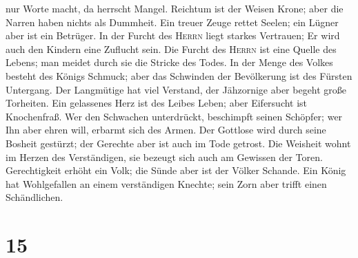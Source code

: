 nur Worte macht, da herrscht Mangel.  Reichtum ist der
Weisen Krone; aber die Narren haben nichts als Dummheit. 
Ein treuer Zeuge rettet Seelen; ein Lügner aber ist ein Betrüger.
 In der Furcht des \textsc{Herrn} liegt starkes
Vertrauen; Er wird auch den Kindern eine Zuflucht sein. 
Die Furcht des \textsc{Herrn} ist eine Quelle des Lebens; man meidet
durch sie die Stricke des Todes.  In der Menge des Volkes
besteht des Königs Schmuck; aber das Schwinden der Bevölkerung ist des
Fürsten Untergang.  Der Langmütige hat viel Verstand, der
Jähzornige aber begeht große Torheiten.  Ein gelassenes
Herz ist des Leibes Leben; aber Eifersucht ist Knochenfraß.
 Wer den Schwachen unterdrückt, beschimpft seinen
Schöpfer; wer Ihn aber ehren will, erbarmt sich des Armen.
 Der Gottlose wird durch seine Bosheit gestürzt; der
Gerechte aber ist auch im Tode getrost.  Die Weisheit
wohnt im Herzen des Verständigen, sie bezeugt sich auch am Gewissen der
Toren.  Gerechtigkeit erhöht ein Volk; die Sünde aber ist
der Völker Schande.  Ein König hat Wohlgefallen an einem
verständigen Knechte; sein Zorn aber trifft einen Schändlichen.

\hypertarget{section-14}{%
\section{15}\label{section-14}}

